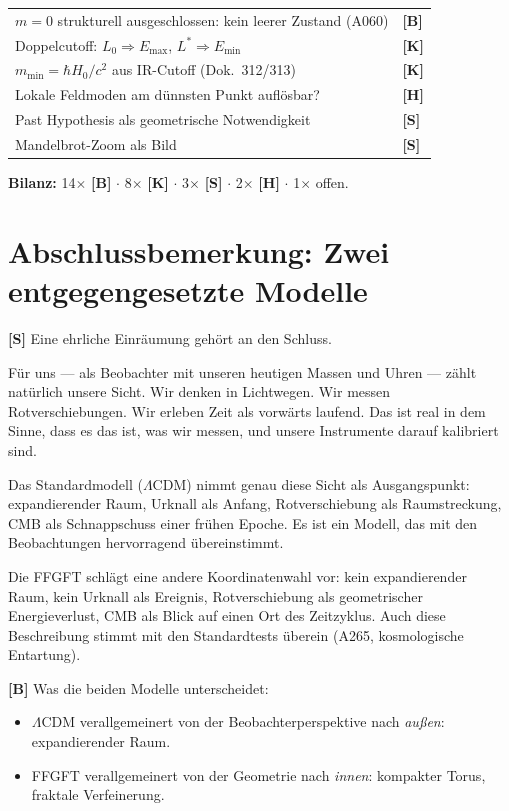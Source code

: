 \begin{center}
\begin{longtable}{@{}p{}l@{}}
$m=0$ strukturell ausgeschlossen: kein leerer Zustand (A060) & \textbf{[B]} \\
Doppelcutoff: $L_0 \Rightarrow E_\text{max}$, $L^* \Rightarrow E_\text{min}$ & \textbf{[K]} \\
$m_\text{min} = \hbar H_0/c^2$ aus IR-Cutoff (Dok.~312/313) & \textbf{[K]} \\
Lokale Feldmoden am dünnsten Punkt auflösbar? & \textbf{[H]} \\
Past Hypothesis als geometrische Notwendigkeit & \textbf{[S]} \\
Mandelbrot-Zoom als Bild & \textbf{[S]} \\
\bottomrule
\end{longtable}
\end{center}

\textbf{Bilanz:} 14$\times$ \textbf{[B]} $\cdot$
8$\times$ \textbf{[K]} $\cdot$
3$\times$ \textbf{[S]} $\cdot$
2$\times$ \textbf{[H]} $\cdot$
1$\times$ offen.

\section{Abschlussbemerkung: Zwei entgegengesetzte Modelle}

\textbf{[S]} Eine ehrliche Einräumung gehört an den Schluss.

Für uns --- als Beobachter mit unseren heutigen Massen und Uhren
--- zählt natürlich unsere Sicht. Wir denken in Lichtwegen. Wir
messen Rotverschiebungen. Wir erleben Zeit als vorwärts laufend.
Das ist real in dem Sinne, dass es das ist, was wir messen, und
unsere Instrumente darauf kalibriert sind.

Das Standardmodell ($\Lambda$CDM) nimmt genau diese Sicht als
Ausgangspunkt: expandierender Raum, Urknall als Anfang,
Rotverschiebung als Raumstreckung, CMB als Schnappschuss einer
frühen Epoche. Es ist ein Modell, das mit den Beobachtungen
hervorragend übereinstimmt.

Die FFGFT schlägt eine andere Koordinatenwahl vor: kein
expandierender Raum, kein Urknall als Ereignis, Rotverschiebung
als geometrischer Energieverlust, CMB als Blick auf einen Ort des
Zeitzyklus. Auch diese Beschreibung stimmt mit den Standardtests
überein (A265, kosmologische Entartung).

\textbf{[B]} Was die beiden Modelle unterscheidet:

\begin{itemize}[leftmargin=1.4em,itemsep=0.2em]
  \item $\Lambda$CDM verallgemeinert von der Beobachterperspektive
        nach \emph{außen}: expandierender Raum.
  \item FFGFT verallgemeinert von der Geometrie nach \emph{innen}:
        kompakter Torus, fraktale Verfeinerung.
\end{itemize}

